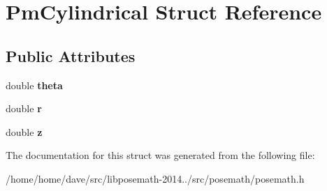 \hypertarget{structPmCylindrical}{}\section{Pm\+Cylindrical Struct Reference}
\label{structPmCylindrical}
\subsection*{Public Attributes}
\begin{DoxyCompactItemize}
\item 
\hypertarget{structPmCylindrical_af39d13ff1b623c783197358f89b5f3cb}{}double {\bfseries theta}\label{structPmCylindrical_af39d13ff1b623c783197358f89b5f3cb}

\item 
\hypertarget{structPmCylindrical_a5ff182da8d4f7f3e9a5a4de3a8a63005}{}double {\bfseries r}\label{structPmCylindrical_a5ff182da8d4f7f3e9a5a4de3a8a63005}

\item 
\hypertarget{structPmCylindrical_a099a6f4e34a7993b442af4cf33abf41e}{}double {\bfseries z}\label{structPmCylindrical_a099a6f4e34a7993b442af4cf33abf41e}

\end{DoxyCompactItemize}


The documentation for this struct was generated from the following file\+:\begin{DoxyCompactItemize}
\item 
/home/home/dave/src/libposemath-\/2014../src/posemath/posemath.\+h\end{DoxyCompactItemize}
